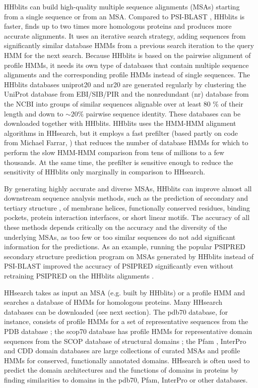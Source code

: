 \documentclass[11pt,a4paper]{article}
\begin{document}
HHblits can build high-quality multiple sequence alignments (MSAs) starting from a single sequence or from an MSA. Compared to PSI-BLAST \cite{Altschul:1997}, HHblits is faster, finds up to two times more homologous proteins and produces more accurate alignments. It uses an iterative search strategy, adding sequences from significantly similar database HMMs from a previous search iteration to the query HMM for the next search. Because HHblits is based on the pairwise alignment of profile HMMs, it needs its own type of databases that contain multiple sequence alignments and the corresponding profile HMMs instead of single sequences. The HHblits databases uniprot20 and nr20 are generated regularly by clustering the UniProt database \cite{uniprot:2010} from EBI/SIB/PIR and the nonredundant (nr) database from the NCBI into groups of similar sequences alignable over at least 80 \% of their length and down to $\sim 20 \%$ pairwise sequence identity. These databases can be downloaded together with HHblits. HHblits uses the HMM-HMM alignment algorithms in HHsearch, but it employs a fast prefilter (based partly on code from Michael Farrar, \cite{Farrar:2007}) that reduces the number of database HMMs for which to perform the slow HMM-HMM comparison from tens of millions to a few thousands. At the same time, the prefilter is sensitive enough to reduce the sensitivity of HHblits only marginally in comparison to HHsearch. 

By generating highly accurate and diverse MSAs, HHblits can improve almost all downstream sequence analysis methods, such as the prediction of secondary and tertiary structure \cite{Jones:1999, Marks:2011}, of membrane helices, functionally conserved residues, binding pockets, protein interaction interfaces, or short linear motifs. The accuracy of all these methods depends critically on the accuracy and the diversity of the underlying MSAs, as too few or too similar sequences do not add significant information for the predictions. As an example, running the popular PSIPRED secondary structure prediction program \cite{Jones:1999} on MSAs generated by HHblits instead of PSI-BLAST improved the accuracy of PSIPRED significantly even without retraining PSIPRED on the HHblits alignments \cite{Remmert:2011}. 

HHsearch takes as input an MSA (e.g. built by HHblits) or a profile HMM and searches a database of HMMs for homologous proteins. Many HHsearch databases can be downloaded (see next section). The pdb70 database, for instance, consists of profile HMMs for a set of representative sequences from the PDB database \cite{PDB:2004}; the scop70 database has profile HMMs for representative domain sequences from the SCOP database of structural domains \cite{SCOP:2000}; the Pfam \cite{Finn:2010}, InterPro \cite{Hunter:2009} and CDD \cite{Marchler:2011} domain databases are large collections of curated MSAs and profile HMMs for conserved, functionally annotated domains. HHsearch is often used to predict the domain architectures and the functions of domains in proteins by finding similarities to domains in the pdb70, Pfam, InterPro or other databases. 
\end{document}
